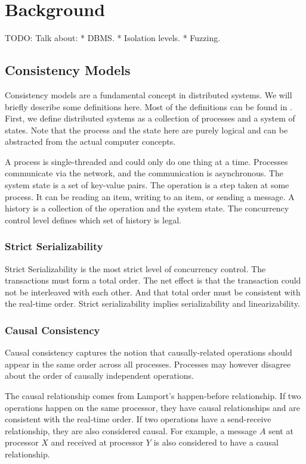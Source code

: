 \chapter{Background}

TODO:
Talk about:
 * DBMS.
 * Isolation levels.
 * Fuzzing.
 

\section{Consistency Models}
Consistency models are a fundamental concept in distributed systems. We will briefly describe some definitions here. Most of the definitions can be found in \cite{Consiste95:online}. First, we define distributed systems as a collection of processes and a system of states. Note that the process and the state here are purely logical and can be abstracted from the actual computer concepts.

A process is single-threaded and could only do one thing at a time. Processes communicate via the network, and the communication is asynchronous. The system state is a set of key-value pairs. The operation is a step taken at some process. It can be reading an item, writing to an item, or sending a message. A history is a collection of the operation and the system state. The concurrency control level defines which set of history is legal.
\subsection{Strict Serializability}
Strict Serializability is the most strict level of concurrency control. The transactions must form a total order. The net effect is that the transaction could not be interleaved with each other. And that total order must be consistent with the real-time order. Strict serializability implies serializability and linearizability. 
\subsection{Causal Consistency}
Causal consistency captures the notion that causally-related operations should appear in the same order across all processes. Processes may however disagree about the order of causally independent operations.

The causal relationship comes from Lamport's happen-before relationship. If two operations happen on the same processor, they have causal relationships and are consistent with the real-time order. If two operations have a send-receive relationship, they are also considered causal. For example, a message $A$ sent at processor $X$ and received at processor $Y$ is also considered to have a causal relationship.






